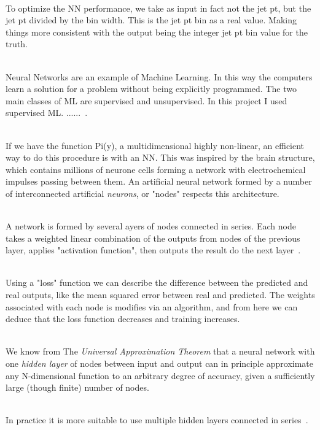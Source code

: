 \ \\To optimize the NN performance, we take as input in fact not the jet pt, but the jet pt divided by the bin width. This is the jet pt bin as a real value. Making things more consistent with the output being the integer jet pt bin value for the truth.

\ \\ Neural Networks are an example of Machine Learning. In this way the computers learn a solution for a problem without being explicitly programmed. The two main classes of ML are supervised and unsupervised. 
In this project I used supervised ML. ......~\cite{AndrewNg}.

\ \\If we have the function Pi(y), a multidimensional highly non-linear, an efficient way to do this procedure is with an NN. This was inspired by the brain structure, which contains millions of neurone cells forming a network with electrochemical impulses passing between them. An artificial neural network formed by a number of interconnected artificial \emph{neurons}, or "nodes" respects this architecture. 

\ \\A network is formed by several ayers of nodes connected in series. Each node takes a weighted linear combination of the outputs from nodes of the previous layer, applies "activation function", then outputs the result do the next layer~\cite{AndrewNg}.

\ \\Using a "loss" function we can describe the difference between the predicted and real outputs, like the mean squared error between real and predicted. The weights associated with each node is modifies via an algorithm, and from here we can deduce that the loss function decreases and training increases.

\ \\We know from The \emph{Universal Approximation Theorem} that a neural network with one \emph{hidden layer} of nodes between input and output can in principle approximate any N-dimensional function to an arbitrary degree of accuracy, given a sufficiently large (though finite) number of nodes. 

\ \\In practice it is more suitable to use multiple hidden layers connected in series~\cite{AndrewNg}.
